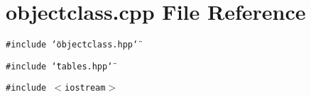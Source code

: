 \section{objectclass.cpp File Reference}
\label{objectclass_8cpp}
{\tt \#include \char`\"{}objectclass.hpp\char`\"{}}\par
{\tt \#include \char`\"{}tables.hpp\char`\"{}}\par
{\tt \#include $<$iostream$>$}\par
